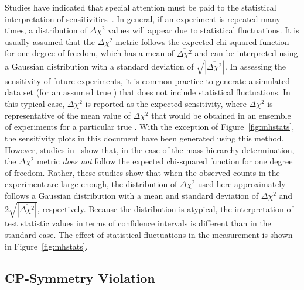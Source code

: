 Studies have indicated that special attention must be paid to the statistical interpretation of  sensitivities~\cite{Qian:2012zn,Blennow:2013oma}.
In general, if an experiment is repeated many times, a distribution of $\Delta\chi^2$
values will appear due to statistical fluctuations.
It is usually assumed that the $\Delta \chi^2$ metric follows the expected chi-squared
function for one degree of freedom, which has a mean of
$\overline{\Delta\chi^2}$ and can be interpreted using a Gaussian
distribution with a standard deviation of
$\sqrt{|\overline{\Delta\chi^2}|}$.
In assessing the  sensitivity of future experiments, it is common practice to generate
a simulated data set (for an assumed true ) that does not include statistical fluctuations. 
In this typical case, $\overline{\Delta\chi^2}$ is reported as the expected sensitivity, 
where $\overline{\Delta\chi^2}$ is representative of the mean value of $\Delta\chi^2$ that 
would be obtained in an ensemble of experiments for a particular true .  
With the exception of Figure~\ref{fig:mhstats}, the sensitivity plots
in this document have been generated using this method.
However, studies in~\cite{Qian:2012zn,Blennow:2013oma}
show that, in the case of the mass hierarchy
determination, the $\Delta \chi^2$ metric {\em does not} follow the expected chi-squared
function for one degree of freedom.  Rather, these studies show that
when the observed counts in the experiment are large enough,
the distribution of $\Delta\chi^2$ used here approximately follows
a Gaussian distribution with a
mean and standard deviation of $\overline{\Delta\chi^2}$ and
$2\sqrt{|\overline{\Delta\chi^2}|}$, respectively. Because the distribution is atypical, the interpretation of 
test statistic values in terms of confidence intervals is different than in the standard case. The effect of statistical fluctuations in the  measurement is shown
in Figure~\ref{fig:mhstats}.



\subsection{CP-Symmetry Violation}
\label{sec:physics-lbnosc-cpv}

